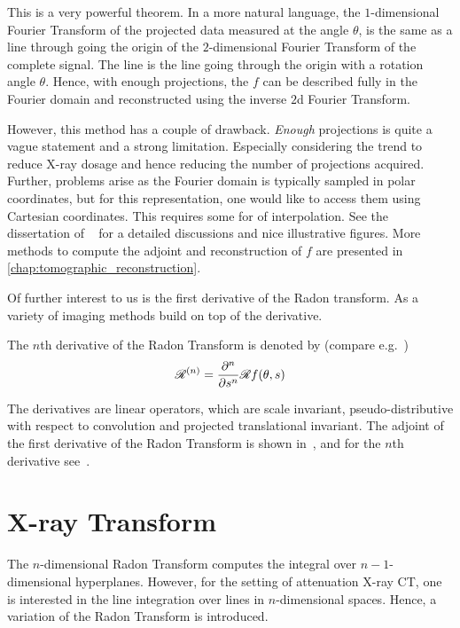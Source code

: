This is a very powerful theorem. In a more natural language, the \(1\)-dimensional Fourier Transform
of the projected data measured at the angle \(\theta\), is the same as a line through going the
origin of the \(2\)-dimensional Fourier Transform of the complete signal. The line is the line going
through the origin with a rotation angle \(\theta\). Hence, with enough projections, the \(f\) can be
described fully in the Fourier domain and reconstructed using the inverse \(2\)d Fourier Transform.

However, this method has a couple of drawback. \textit{Enough} projections is quite a vague
statement and a strong limitation. Especially considering the trend to reduce X-ray dosage and hence
reducing the number of projections acquired. Further, problems arise as the Fourier domain is
typically sampled in polar coordinates, but for this representation, one would like to access them
using Cartesian coordinates. This requires some for of interpolation. See the dissertation of
\citeauthor{vogel_tomographic_2015}~\cite[Chapter~4.1.2]{vogel_tomographic_2015} for a detailed
discussions and nice illustrative figures. More methods to compute the adjoint and reconstruction of
\(f\) are presented in \autoref{chap:tomographic_reconstruction}.

Of further interest to us is the first derivative of the Radon transform. As a variety of imaging
methods build on top of the derivative.

\begin{definition}
	The \(n\)th derivative of the Radon Transform is denoted by (compare
	e.g.\ \cite{nilchian_differential_2012,nilchian_fast_2013})
	\[ \mathscr{R}^{(n)} = \frac{\partial^n}{\partial s^n} \mathscr{R} f(\theta, s)\]
\end{definition}

The derivatives are linear operators, which are scale invariant, pseudo-distributive with respect to
convolution and projected translational invariant. The adjoint of the first derivative of the Radon
Transform is shown in~\cite{nilchian_differential_2012}, and for the \(n\)th derivative
see~\cite{nilchian_fast_2013}.

\section{X-ray Transform}\label{sec:xray_transform}

The \(n\)-dimensional Radon Transform computes the integral over \(n-1\)-dimensional hyperplanes.
However, for the setting of attenuation X-ray CT, one is interested in the line integration over
lines in \(n\)-dimensional spaces. Hence, a variation of the Radon Transform is introduced.

